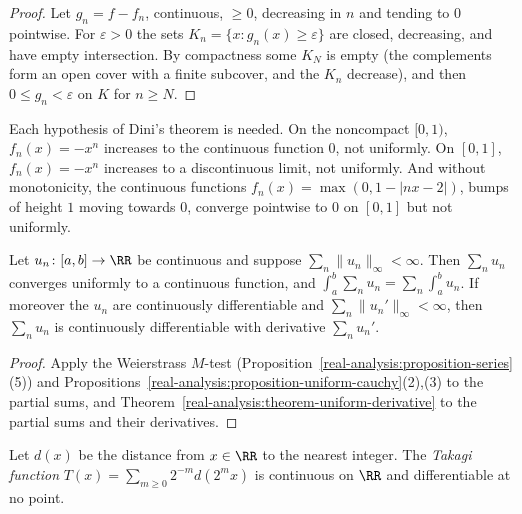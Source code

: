 \begin{proof}
Let $g_n = f - f_n$, continuous, $\geq 0$, decreasing in $n$ and tending to $0$ pointwise. For $\varepsilon > 0$ the sets $K_n = \{x : g_n(x) \geq \varepsilon\}$ are closed, decreasing, and have empty intersection. By
compactness some $K_N$ is empty (the complements form an open cover with a finite subcover, and the $K_n$ decrease), and then $0 \leq g_n < \varepsilon$ on $K$ for $n \geq N$.
\end{proof}

\begin{counterexample}\label{real-analysis:counterexample-dini}
Each hypothesis of Dini's theorem is needed. On the noncompact $[0, 1)$, $f_n(x) = -x^n$ increases to the continuous function $0$, not uniformly. On $[0, 1]$, $f_n(x) = -x^n$ increases to a discontinuous limit, not
uniformly. And without monotonicity, the continuous functions $f_n(x) = \max(0, 1 - |nx - 2|)$, bumps of height $1$ moving towards $0$, converge pointwise to $0$ on $[0, 1]$ but not uniformly.
\end{counterexample}

\begin{corollary}\label{real-analysis:corollary-series-functions}
Let $u_n \colon [a, b] \to \RR$ be continuous and suppose $\sum_n\|u_n\|_\infty < \infty$. Then $\sum_nu_n$ converges uniformly to a continuous function, and $\int_a^b\sum_nu_n = \sum_n\int_a^bu_n$. If moreover
the $u_n$ are continuously differentiable and $\sum_n\|u_n'\|_\infty < \infty$, then $\sum_nu_n$ is continuously differentiable with derivative $\sum_nu_n'$.
\end{corollary}

\begin{proof}
Apply the Weierstrass $M$-test (Proposition~\ref{real-analysis:proposition-series}(5)) and Propositions~\ref{real-analysis:proposition-uniform-cauchy}(2),(3) to the partial sums, and Theorem~\ref{real-analysis:theorem-uniform-derivative}
to the partial sums and their derivatives.
\end{proof}

\begin{theorem}\label{real-analysis:theorem-takagi}
Let $d(x)$ be the distance from $x \in \RR$ to the nearest integer. The \emph{Takagi function} $T(x) = \sum_{m \geq 0}2^{-m}d(2^mx)$ is continuous on $\RR$ and differentiable at no point.
\end{theorem}

